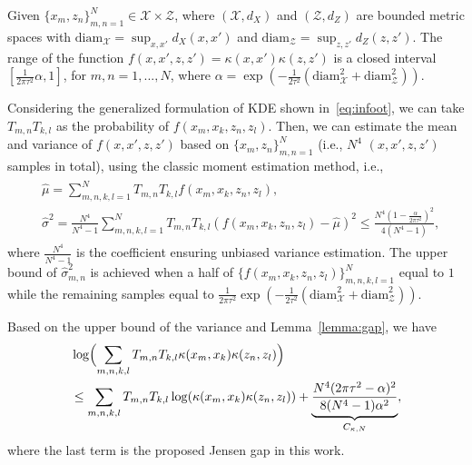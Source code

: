 \documentclass{article}
\begin{document}
Given $\{x_m,z_n\}_{m,n=1}^{N}\in\mathcal{X}\times\mathcal{Z}$, where $(\mathcal{X},d_X)$ and $(\mathcal{Z},d_Z)$ are bounded metric spaces with $\text{diam}_{\mathcal{X}}=\sup_{x,x'}d_X(x,x')$ and $\text{diam}_{\mathcal{Z}}=\sup_{z,z'}d_Z(z,z')$. 
The range of the function $f(x,x',z,z')=\kappa(x,x')\kappa(z,z')$ is a closed interval $[\frac{1}{2\pi\tau^2}\alpha, 1]$, for $m,n=1,...,N$, where $\alpha=\exp(-\frac{1}{2\tau^2}(\text{diam}_{\mathcal{X}}^2+\text{diam}_{\mathcal{Z}}^2))$.

Considering the generalized formulation of KDE shown in~\eqref{eq:infoot}, we can take $T_{m,n}T_{k,l}$ as the probability of $f(x_m,x_k,z_n,z_l)$. 
Then, we can estimate the mean and variance of $f(x,x',z,z')$ based on $\{x_m,z_n\}_{m,n=1}^N$ (i.e., $N^4$ $(x,x',z,z')$ samples in total), using the classic moment estimation method, i.e.,
\begin{eqnarray}
\begin{aligned}
    &\hat{\mu}=\sum_{m,n,k,l=1}^N T_{m,n}T_{k,l} f(x_m,x_k,z_n,z_l),\\
    &\hat{\sigma}^2=\frac{N^4}{N^4-1}\sum_{m,n,k,l=1}^N T_{m,n}T_{k,l} (f(x_m,x_k,z_n,z_l) - \hat{\mu})^2\leq \frac{N^4(1-\frac{\alpha}{2\pi\tau^2})^2}{4(N^4-1)},
\end{aligned}
\end{eqnarray}
where $\frac{N^4}{N^4-1}$ is the coefficient ensuring unbiased variance estimation.
The upper bound of $\hat{\sigma}_{m,n}^2$ is achieved when a half of $\{f(x_m,x_k,z_n,z_l)\}_{m,n,k,l=1}^N$ equal to $1$ while the remaining samples equal to $\frac{1}{2\pi\tau^2}\exp(-\frac{1}{2\tau^2}(\text{diam}_{\mathcal{X}}^2+\text{diam}_{\mathcal{Z}}^2))$. 

Based on the upper bound of the variance and Lemma~\ref{lemma:gap}, we have
\begin{eqnarray}\label{eq:c_kappa}
\begin{aligned}
    &\log\Bigl(\sum_{m,n,k,l}T_{m,n}T_{k,l}\kappa(x_m,x_k)\kappa(z_n,z_l)\Bigr)\\
    &\leq \sum_{m,n,k,l}T_{m,n}T_{k,l}\log(\kappa(x_m,x_k)\kappa(z_n,z_l)) + \underbrace{\frac{N^4(2\pi\tau^2-\alpha)^2}{8(N^4-1)\alpha^2}}_{C_{\kappa,N}},
\end{aligned}    
\end{eqnarray}
where the last term is the proposed Jensen gap in this work.
\end{document}
